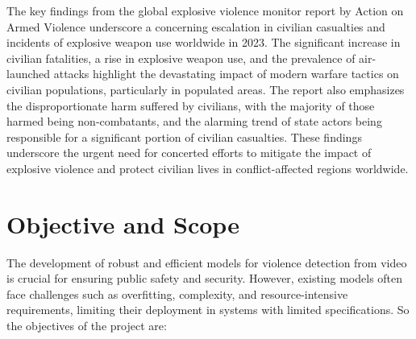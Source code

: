 \noindent The key findings from the global explosive violence monitor report by Action on Armed Violence underscore a concerning escalation in civilian casualties and incidents of explosive weapon use worldwide in 2023. The significant increase in civilian fatalities, a rise in explosive weapon use, and the prevalence of air-launched attacks highlight the devastating impact of modern warfare tactics on civilian populations, particularly in populated areas. The report also emphasizes the disproportionate harm suffered by civilians, with the majority of those harmed being non-combatants, and the alarming trend of state actors being responsible for a significant portion of civilian casualties. These findings underscore the urgent need for concerted efforts to mitigate the impact of explosive violence and protect civilian lives in conflict-affected regions worldwide.

\clearpage

\section{Objective and Scope}


The development of robust and efficient models for violence detection from video is crucial for ensuring public safety and security. However, existing models often face challenges such as overfitting, complexity, and resource-intensive requirements, limiting their deployment in systems with limited specifications\cite{overfit}. So the objectives of the project are:

